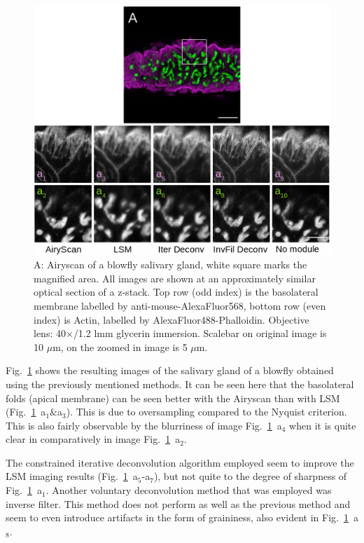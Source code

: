 \begin{figure}[h!]
\centering
\includegraphics[width=\columnwidth]{Exp_6_Airyscan/Figures/BlowSl}
\caption{A: Airyscan of a blowfly salivary gland, white square marks the magnified area. 
All images are shown at an approximately similar optical section of a z-stack. 
Top row (odd index) is the basolateral membrane labelled by anti-mouse-AlexaFluor568, bottom row (even index) is Actin, labelled by AlexaFluor488-Phalloidin. 
Objective lens: 40$\times$/1.2 lmm glycerin immersion. 
Scalebar on original image is 10 $\mu$m, on the zoomed in image is 5 $\mu$m.}
\label{fig:bloair}
\end{figure}

Fig.~\ref{fig:bloair} shows the resulting images of the salivary gland of a blowfly obtained using the previously mentioned methods. 
It can be seen here that the basolateral folds (apical membrane) can be seen better with the Airyscan than with LSM (Fig.~\ref{fig:bloair}~a$_{1}$\&a$_{3}$). 
This is due to oversampling compared to the Nyquist criterion. 
This is also fairly observable by the blurriness of image Fig.~\ref{fig:bloair}~a$_{4}$ when it is quite clear in comparatively in image Fig.~\ref{fig:bloair}~a$_{2}$. 

The constrained iterative deconvolution algorithm employed seem to improve the LSM imaging results (Fig.~\ref{fig:bloair}~a$_{5}$-a$_{7}$), but not quite to the degree of sharpness of Fig.~\ref{fig:bloair}~a$_{1}$. 
Another voluntary deconvolution method that was employed was inverse filter. 
This method does not perform as well as the previous method and seem to even introduce artifacts in the form of graininess, also evident in Fig.~\ref{fig:bloair}~a$_{8}$. 

